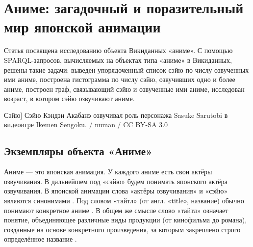 
\chapter{Аниме: загадочный и поразительный мир японской анимации}
Статья посвящена исследованию объекта Викиданных «аниме». С помощью SPARQL-запросов, вычисляемых на объектах типа «аниме»
в Викиданных, решены такие задачи: выведен упорядоченный список сэйю по числу озвученных ими аниме, построена гистограмма по числу сэйю, озвучивших одно и более аниме, построен граф, связывающий сэйю и озвученные ими аниме, исследован возраст, в котором сэйю озвучивают аниме. 


\begin{marginfigure}[0.0cm]
{
	\setlength{\fboxsep}{0pt}%
	\setlength{\fboxrule}{1pt}%
}
\caption
[Сэйю]
{
Сэйю Кэндзи Акабанэ озвучивал роль персонажа Sasuke Sarutobi в видеоигре Ikemen Sengoku. / numan / CC BY-SA 3.0
}
\label{fig:seyu}
\end{marginfigure}

\label{ch:anime}

\section{Экземпляры объекта «Аниме»}

Аниме — это японская анимация. У каждого аниме есть свои актёры озвучивания. В дальнейшем под «сэйю» будем понимать японского актёра озвучивания. В японской анимации слова «актёры озвучивания» и «сэйю» являются синонимами \cite{seiyu_def}. Под словом «тайтл» (от англ. «title», название) обычно понимают конкретное аниме \cite{anime_social}. В общем же смысле слово «тайтл» означает понятие, объединяющее различные виды продукции (от кинофильма до романа), созданные на основе конкретного произведения, за которым закреплено строго определённое название \cite{anime_title_def}.


